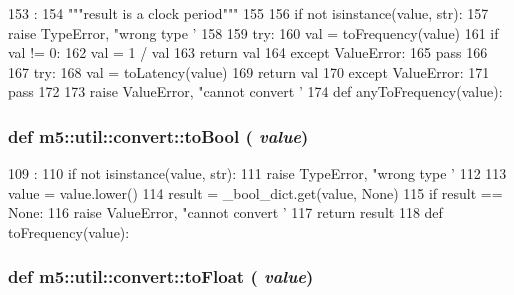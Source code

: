 \begin{DoxyCode}
153                        :
154     """result is a clock period"""
155 
156     if not isinstance(value, str):
157         raise TypeError, "wrong type '%
158 
159     try:
160         val = toFrequency(value)
161         if val != 0:
162             val = 1 / val
163         return val
164     except ValueError:
165         pass
166 
167     try:
168         val = toLatency(value)
169         return val
170     except ValueError:
171         pass
172 
173     raise ValueError, "cannot convert '%
174 
def anyToFrequency(value):
\end{DoxyCode}
\hypertarget{namespacem5_1_1util_1_1convert_ac13ee9959561c3fd95f4859da29ca3eb}{
\subsubsection[{toBool}]{\setlength{\rightskip}{0pt plus 5cm}def m5::util::convert::toBool ( {\em value})}}
\label{namespacem5_1_1util_1_1convert_ac13ee9959561c3fd95f4859da29ca3eb}



\begin{DoxyCode}
109                  :
110     if not isinstance(value, str):
111         raise TypeError, "wrong type '%
112 
113     value = value.lower()
114     result = _bool_dict.get(value, None)
115     if result == None:
116         raise ValueError, "cannot convert '%
117     return result
118 
def toFrequency(value):
\end{DoxyCode}
\hypertarget{namespacem5_1_1util_1_1convert_a2ab36011290a0ed8c1c062bf62531d96}{
\subsubsection[{toFloat}]{\setlength{\rightskip}{0pt plus 5cm}def m5::util::convert::toFloat ( {\em value})}}
\label{namespacem5_1_1util_1_1convert_a2ab36011290a0ed8c1c062bf62531d96}



